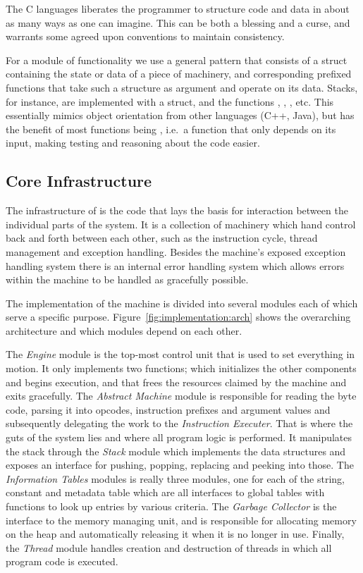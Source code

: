 The C languages liberates the programmer to structure code and data in about as
many ways as one can imagine. This can be both a blessing and a curse, and
warrants some agreed upon conventions to maintain consistency.

For a module of functionality we use a general pattern that consists of a struct
containing the state or data of a piece of machinery, and corresponding prefixed
functions that take such a structure as argument and operate on its
data. Stacks, for instance, are implemented with a  struct, and the
functions , , , etc. This
essentially mimics object orientation from other languages (C++, Java), but has
the benefit of most functions being , i.e.~a function that only
depends on its input, making testing and reasoning about the code easier.

\subsection{Core Infrastructure}
\label{sec:implementation:core}

The infrastructure of \thename{} is the code that lays the basis for interaction
between the individual parts of the system. It is a collection of machinery
which hand control back and forth between each other, such as the instruction
cycle, thread management and exception handling. Besides the machine's exposed
exception handling system there is an internal error handling system which
allows errors within the machine to be handled as gracefully possible.

The implementation of the machine is divided into several modules each of which
serve a specific purpose. Figure~\ref{fig:implementation:arch} shows the
overarching architecture and which modules depend on each other.

The \textit{Engine} module is the top-most control unit that is used to set
everything in motion. It only implements two functions;  which
initializes the other components and begins execution, and  that
frees the resources claimed by the machine and exits gracefully. The
\textit{Abstract Machine} module is responsible for reading the byte code,
parsing it into opcodes, instruction prefixes and argument values and
subsequently delegating the work to the \textit{Instruction Executer}. That is
where the guts of the system lies and where all program logic is performed. It
manipulates the stack through the \textit{Stack} module which implements the
data structures and exposes an interface for pushing, popping, replacing and
peeking into those. The \textit{Information Tables} modules is really three
modules, one for each of the string, constant and metadata table which are all
interfaces to global tables with functions to look up entries by various
criteria. The \textit{Garbage Collector} is the interface to the memory managing
unit, and is responsible for allocating memory on the heap and automatically
releasing it when it is no longer in use. Finally, the \textit{Thread} module
handles creation and destruction of threads in which all program code is
executed.

